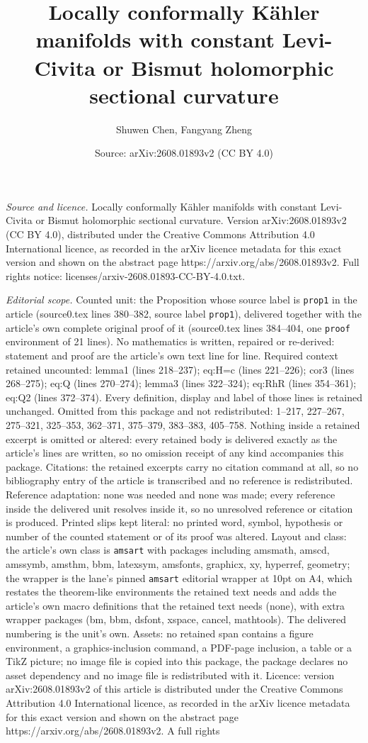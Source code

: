\documentclass[10pt,a4paper]{amsart}
\title[Locally conformally K\"ahler manifolds with constant Levi-Ci]{Locally conformally K\"ahler manifolds with constant Levi-Civita or Bismut holomorphic sectional curvature}
\author{Shuwen Chen, Fangyang Zheng}
\date{Source: arXiv:2608.01893v2 (CC BY 4.0)}
\begin{document}
\maketitle

\noindent\emph{Source and licence.} Locally conformally K\"ahler manifolds with constant Levi-Civita or Bismut holomorphic sectional curvature. Version arXiv:2608.01893v2 (CC BY 4.0), distributed under the Creative Commons Attribution 4.0 International licence, as recorded in the arXiv licence metadata for this exact version and shown on the abstract page https://arxiv.org/abs/2608.01893v2. Full rights notice: licenses/arxiv-2608.01893-CC-BY-4.0.txt.\par\smallskip

\noindent\textit{Editorial scope.} Counted unit: the Proposition whose source label is \texttt{prop1} in the article (source0.tex lines 380--382, source label \texttt{prop1}), delivered together with the article's own complete original proof of it (source0.tex lines 384--404, one \texttt{proof} environment of 21 lines). No mathematics is written, repaired or re-derived: statement and proof are the article's own text line for line. Required context retained uncounted: lemma1 (lines 218--237); eq:H=c (lines 221--226); cor3 (lines 268--275); eq:Q (lines 270--274); lemma3 (lines 322--324); eq:RhR (lines 354--361); eq:Q2 (lines 372--374). Every definition, display and label of those lines is retained unchanged. Omitted from this package and not redistributed: 1--217, 227--267, 275--321, 325--353, 362--371, 375--379, 383--383, 405--758. Nothing inside a retained excerpt is omitted or altered: every retained body is delivered exactly as the article's lines are written, so no omission receipt of any kind accompanies this package. Citations: the retained excerpts carry no citation command at all, so no bibliography entry of the article is transcribed and no reference is redistributed. Reference adaptation: none was needed and none was made; every reference inside the delivered unit resolves inside it, so no unresolved reference or citation is produced. Printed slips kept literal: no printed word, symbol, hypothesis or number of the counted statement or of its proof was altered. Layout and class: the article's own class is \texttt{amsart} with packages including amsmath, amscd, amssymb, amsthm, bbm, latexsym, amsfonts, graphicx, xy, hyperref, geometry; the wrapper is the lane's pinned \texttt{amsart} editorial wrapper at 10pt on A4, which restates the theorem-like environments the retained text needs and adds the article's own macro definitions that the retained text needs (none), with extra wrapper packages (bm, bbm, dsfont, xspace, cancel, mathtools). The delivered numbering is the unit's own. Assets: no retained span contains a figure environment, a graphics-inclusion command, a PDF-page inclusion, a table or a TikZ picture; no image file is copied into this package, the package declares no asset dependency and no image file is redistributed with it. Licence: version arXiv:2608.01893v2 of this article is distributed under the Creative Commons Attribution 4.0 International licence, as recorded in the arXiv licence metadata for this exact version and shown on the abstract page https://arxiv.org/abs/2608.01893v2. A full rights 
\end{document}

